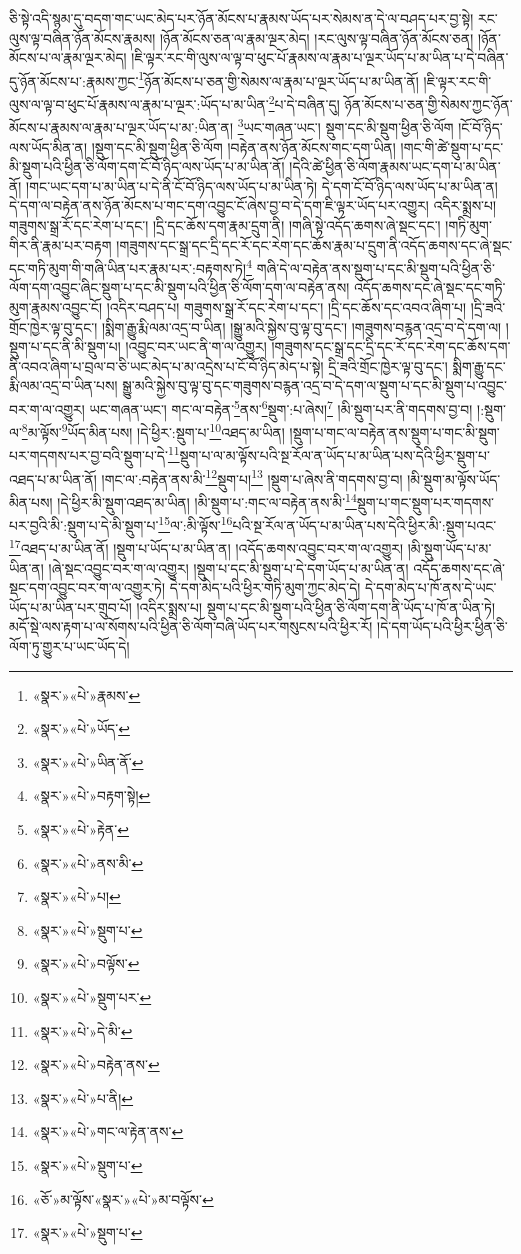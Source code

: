 ཅི་སྟེ་འདི་སྙམ་དུ་བདག་གང་ཡང་མེད་པར་ཉོན་མོངས་པ་རྣམས་ཡོད་པར་སེམས་ན་དེ་ལ་བཤད་པར་བྱ་སྟེ། རང་ལུས་ལྟ་བཞིན་ཉོན་མོངས་རྣམས། །ཉོན་མོངས་ཅན་ལ་རྣམ་ལྔར་མེད། །རང་ལུས་ལྟ་བཞིན་ཉོན་མོངས་ཅན། །ཉོན་མོངས་པ་ལ་རྣམ་ལྔར་མེད། །ཇི་ལྟར་རང་གི་ལུས་ལ་ལྟ་བ་ཕུང་པོ་རྣམས་ལ་རྣམ་པ་ལྔར་ཡོད་པ་མ་ཡིན་པ་དེ་བཞིན་དུ་ཉོན་མོངས་པ་:རྣམས་ཀྱང་\footnote{«སྣར་»«པེ་»རྣམས་}ཉོན་མོངས་པ་ཅན་གྱི་སེམས་ལ་རྣམ་པ་ལྔར་ཡོད་པ་མ་ཡིན་ནོ། །ཇི་ལྟར་རང་གི་ལུས་ལ་ལྟ་བ་ཕུང་པོ་རྣམས་ལ་རྣམ་པ་ལྔར་:ཡོད་པ་མ་ཡིན་\footnote{«སྣར་»«པེ་»ཡོད་}པ་དེ་བཞིན་དུ། ཉོན་མོངས་པ་ཅན་གྱི་སེམས་ཀྱང་ཉོན་མོངས་པ་རྣམས་ལ་རྣམ་པ་ལྔར་ཡོད་པ་མ་:ཡིན་ན། \footnote{«སྣར་»«པེ་»ཡིན་ནོ་}ཡང་གཞན་ཡང་། སྡུག་དང་མི་སྡུག་ཕྱིན་ཅི་ལོག །ངོ་བོ་ཉིད་ལས་ཡོད་མིན་ན། །སྡུག་དང་མི་སྡུག་ཕྱིན་ཅི་ལོག །བརྟེན་ནས་ཉོན་མོངས་གང་དག་ཡིན། །གང་གི་ཚེ་སྡུག་པ་དང་མི་སྡུག་པའི་ཕྱིན་ཅི་ལོག་དག་ངོ་བོ་ཉིད་ལས་ཡོད་པ་མ་ཡིན་ནོ། །དེའི་ཚེ་ཕྱིན་ཅི་ལོག་རྣམས་ཡང་དག་པ་མ་ཡིན་ནོ། །གང་ཡང་དག་པ་མ་ཡིན་པ་དེ་ནི་ངོ་བོ་ཉིད་ལས་ཡོད་པ་མ་ཡིན་ཏེ། དེ་དག་ངོ་བོ་ཉིད་ལས་ཡོད་པ་མ་ཡིན་ན། དེ་དག་ལ་བརྟེན་ནས་ཉོན་མོངས་པ་གང་དག་འབྱུང་ངོ་ཞེས་བྱ་བ་དེ་དག་ཇི་ལྟར་ཡོད་པར་འགྱུར། འདིར་སྨྲས་པ། གཟུགས་སྒྲ་རོ་དང་རེག་པ་དང་། །དྲི་དང་ཆོས་དག་རྣམ་དྲུག་ནི། །གཞི་སྟེ་འདོད་ཆགས་ཞེ་སྡང་དང་། །གཏི་མུག་གིར་ནི་རྣམ་པར་བརྟག །གཟུགས་དང་སྒྲ་དང་དྲི་དང་རོ་དང་རེག་དང་ཆོས་རྣམ་པ་དྲུག་ནི་འདོད་ཆགས་དང་ཞེ་སྡང་དང་གཏི་མུག་གི་གཞི་ཡིན་པར་རྣམ་པར་:བརྟགས་ཏེ།\footnote{«སྣར་»«པེ་»བརྟག་སྟེ།} གཞི་དེ་ལ་བརྟེན་ནས་སྡུག་པ་དང་མི་སྡུག་པའི་ཕྱིན་ཅི་ལོག་དག་འབྱུང་ཞིང་སྡུག་པ་དང་མི་སྡུག་པའི་ཕྱིན་ཅི་ལོག་དག་ལ་བརྟེན་ནས། འདོད་ཆགས་དང་ཞེ་སྡང་དང་གཏི་མུག་རྣམས་འབྱུང་ངོ། །འདིར་བཤད་པ། གཟུགས་སྒྲ་རོ་དང་རེག་པ་དང་། །དྲི་དང་ཆོས་དང་འབའ་ཞིག་པ། །དྲི་ཟའི་གྲོང་ཁྱེར་ལྟ་བུ་དང་། །སྨིག་རྒྱུ་རྨི་ལམ་འདྲ་བ་ཡིན། །སྒྱུ་མའི་སྐྱེས་བུ་ལྟ་བུ་དང་། །གཟུགས་བརྙན་འདྲ་བ་དེ་དག་ལ། །སྡུག་པ་དང་ནི་མི་སྡུག་པ། །འབྱུང་བར་ཡང་ནི་ག་ལ་འགྱུར། །གཟུགས་དང་སྒྲ་དང་དྲི་དང་རོ་དང་རེག་དང་ཆོས་དག་ནི་འབའ་ཞིག་པ་བྲལ་བ་ཅི་ཡང་མེད་པ་མ་འདྲེས་པ་ངོ་བོ་ཉིད་མེད་པ་སྟེ། དྲི་ཟའི་གྲོང་ཁྱེར་ལྟ་བུ་དང་། སྨིག་རྒྱུ་དང་རྨི་ལམ་འདྲ་བ་ཡིན་པས། སྒྱུ་མའི་སྐྱེས་བུ་ལྟ་བུ་དང་གཟུགས་བརྙན་འདྲ་བ་དེ་དག་ལ་སྡུག་པ་དང་མི་སྡུག་པ་འབྱུང་བར་ག་ལ་འགྱུར། ཡང་གཞན་ཡང་། གང་ལ་བརྟེན་\footnote{«སྣར་»«པེ་»རྟེན་}ནས་\footnote{«སྣར་»«པེ་»ནས་མི་}སྡུག་:པ་ཞེས།\footnote{«སྣར་»«པེ་»པ།} །མི་སྡུག་པར་ནི་གདགས་བྱ་བ། །:སྡུག་ལ་\footnote{«སྣར་»«པེ་»སྡུག་པ་}མ་ལྟོས་\footnote{«སྣར་»«པེ་»བལྟོས་}ཡོད་མིན་པས། །དེ་ཕྱིར་:སྡུག་པ་\footnote{«སྣར་»«པེ་»སྡུག་པར་}འཐད་མ་ཡིན། །སྡུག་པ་གང་ལ་བརྟེན་ནས་སྡུག་པ་གང་མི་སྡུག་པར་གདགས་པར་བྱ་བའི་སྡུག་པ་དེ་\footnote{«སྣར་»«པེ་»དེ་མི་}སྡུག་པ་ལ་མ་ལྟོས་པའི་སྔ་རོལ་ན་ཡོད་པ་མ་ཡིན་པས་དེའི་ཕྱིར་སྡུག་པ་འཐད་པ་མ་ཡིན་ནོ། །གང་ལ་:བརྟེན་ནས་མི་\footnote{«སྣར་»«པེ་»བརྟེན་ནས་}སྡུག་པ།\footnote{«སྣར་»«པེ་»པ་ནི།} །སྡུག་པ་ཞེས་ནི་གདགས་བྱ་བ། །མི་སྡུག་མ་ལྟོས་ཡོད་མིན་པས། །དེ་ཕྱིར་མི་སྡུག་འཐད་མ་ཡིན། །མི་སྡུག་པ་:གང་ལ་བརྟེན་ནས་མི་\footnote{«སྣར་»«པེ་»གང་ལ་རྟེན་ནས་}སྡུག་པ་གང་སྡུག་པར་གདགས་པར་བྱའི་མི་:སྡུག་པ་དེ་མི་སྡུག་པ་\footnote{«སྣར་»«པེ་»སྡུག་པ་}ལ་:མི་ལྟོས་\footnote{«ཅོ་»མ་ལྟོས་«སྣར་»«པེ་»མ་བལྟོས་}པའི་སྔ་རོལ་ན་ཡོད་པ་མ་ཡིན་པས་དེའི་ཕྱིར་མི་:སྡུག་པའང་\footnote{«སྣར་»«པེ་»སྡུག་པ་}འཐད་པ་མ་ཡིན་ནོ། །སྡུག་པ་ཡོད་པ་མ་ཡིན་ན། །འདོད་ཆགས་འབྱུང་བར་ག་ལ་འགྱུར། །མི་སྡུག་ཡོད་པ་མ་ཡིན་ན། །ཞེ་སྡང་འབྱུང་བར་ག་ལ་འགྱུར། །སྡུག་པ་དང་མི་སྡུག་པ་དེ་དག་ཡོད་པ་མ་ཡིན་ན། འདོད་ཆགས་དང་ཞེ་སྡང་དག་འབྱུང་བར་ག་ལ་འགྱུར་ཏེ། དེ་དག་མེད་པའི་ཕྱིར་གཏི་མུག་ཀྱང་མེད་དེ། དེ་དག་མེད་པ་ཁོ་ནས་དེ་ཡང་ཡོད་པ་མ་ཡིན་པར་གྲུབ་པོ། །འདིར་སྨྲས་པ། སྡུག་པ་དང་མི་སྡུག་པའི་ཕྱིན་ཅི་ལོག་དག་ནི་ཡོད་པ་ཁོ་ན་ཡིན་ཏེ། མདོ་སྡེ་ལས་རྟག་པ་ལ་སོགས་པའི་ཕྱིན་ཅི་ལོག་བཞི་ཡོད་པར་གསུངས་པའི་ཕྱིར་རོ། །དེ་དག་ཡོད་པའི་ཕྱིར་ཕྱིན་ཅི་ལོག་ཏུ་གྱུར་པ་ཡང་ཡོད་དེ། 